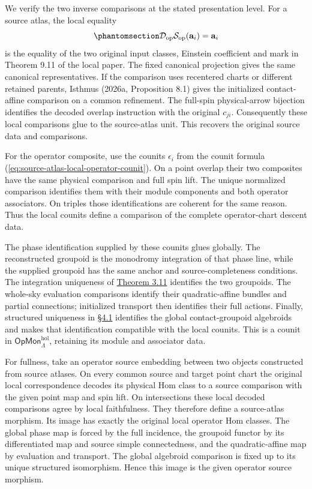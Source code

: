\documentclass[
  english,
  11pt,
  reqno]{amsart}
\begin{document}
We verify the two inverse comparisons at the stated presentation level.
For a source atlas, the local equality
\begin{equation}\protect\phantomsection\label{eq:source-atlas-original-class-unit}{
\mathcal D_{\mathrm{op}}\mathcal S_{\mathrm{op}}(\mathbf a_i)
=\mathbf a_i
}\end{equation} is the equality of the two original input classes,
Einstein coefficient and mark in Theorem 9.11 of the local paper. The
fixed canonical projection gives the same canonical representatives. If
the comparison uses recentered charts or different retained parents,
Isthmus (2026a, Proposition 8.1) gives the initialized contact-affine
comparison on a common refinement. The full-spin physical-arrow
bijection identifies the decoded overlap instruction with the original
\(c_{ji}\). Consequently these local comparisons glue to the
source-atlas unit. This recovers the original source data and
comparisons.

For the operator composite, use the counits \(\epsilon_i\) from the
counit formula (\ref{eq:source-atlas-local-operator-counit}). On a point
overlap their two composites have the same physical comparison and full
spin lift. The unique normalized comparison identifies them with their
module components and both operator associators. On triples those
identifications are coherent for the same reason. Thus the local counits
define a comparison of the complete operator-chart descent data.

The phase identification supplied by these counits glues globally. The
reconstructed groupoid is the monodromy integration of that phase line,
while the supplied groupoid has the same anchor and source-completeness
conditions. The integration uniqueness of
\hyperref[thm:independent-monodromy-equivalence]{Theorem 3.11}
identifies the two groupoids. The whole-sky evaluation comparisons
identify their quadratic-affine bundles and partial connections;
initialized transport then identifies their full actions. Finally,
structured uniqueness in
\hyperref[sec:operator-contact-quantization-v08]{§4.1} identifies the
global contact-groupoid algebroids and makes that identification
compatible with the local counits. This is a counit in
\(\mathsf{OpMon}^{\mathrm{hol}}_\Lambda\), retaining its module and
associator data.

For fullness, take an operator source embedding between two objects
constructed from source atlases. On every common source and target point
chart the original local correspondence decodes its physical Hom class
to a source comparison with the given point map and spin lift. On
intersections these local decoded comparisons agree by local
faithfulness. They therefore define a source-atlas morphism. Its image
has exactly the original local operator Hom classes. The global phase
map is forced by the full incidence, the groupoid functor by its
differentiated map and source simple connectedness, and the
quadratic-affine map by evaluation and transport. The global algebroid
comparison is fixed up to its unique structured isomorphism. Hence this
image is the given operator source morphism.
\end{document}
